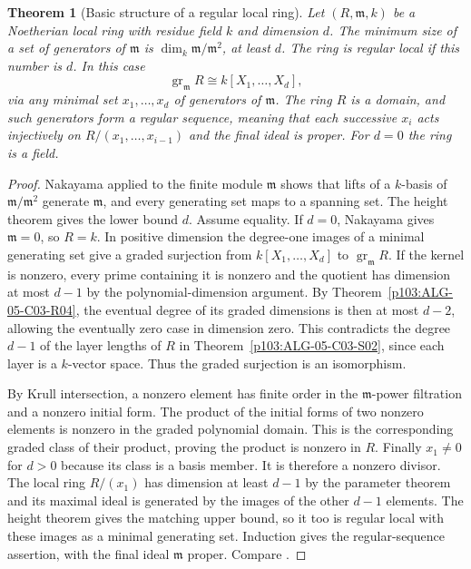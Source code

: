 \documentclass[11pt,oneside,openany]{book}
\newtheorem{theorem}{Theorem}[chapter]
\theoremstyle{definition}
\theoremstyle{remark}
\begin{document}
\begin{theorem}[Basic structure of a regular local ring]\label{p103:ALG-05-C03-S03}
Let \((R,\mathfrak m,k)\) be a Noetherian local ring with residue field \(k\) and dimension \(d\). The minimum size of a set of generators of \(\mathfrak m\) is \(\dim_k\mathfrak m/\mathfrak m^2\), at least \(d\). The ring is regular local if this number is \(d\). In this case
\[
 \operatorname{gr}_{\mathfrak m}R\cong k[X_1,\ldots,X_d],
\]
via any minimal set \(x_1,\ldots,x_d\) of generators of \(\mathfrak m\). The ring \(R\) is a domain, and such generators form a regular sequence, meaning that each successive \(x_i\) acts injectively on \(R/(x_1,\ldots,x_{i-1})\) and the final ideal is proper. For \(d=0\) the ring is a field.
\end{theorem}
\begin{proof}
Nakayama applied to the finite module \(\mathfrak m\) shows that lifts of a \(k\)-basis of \(\mathfrak m/\mathfrak m^2\) generate \(\mathfrak m\), and every generating set maps to a spanning set. The height theorem gives the lower bound \(d\). Assume equality. If \(d=0\), Nakayama gives \(\mathfrak m=0\), so \(R=k\). In positive dimension the degree-one images of a minimal generating set give a graded surjection from \(k[X_1,\ldots,X_d]\) to \(\operatorname{gr}_{\mathfrak m}R\). If the kernel is nonzero, every prime containing it is nonzero and the quotient has dimension at most \(d-1\) by the polynomial-dimension argument. By Theorem~\ref{p103:ALG-05-C03-R04}, the eventual degree of its graded dimensions is then at most \(d-2\), allowing the eventually zero case in dimension zero. This contradicts the degree \(d-1\) of the layer lengths of \(R\) in Theorem~\ref{p103:ALG-05-C03-S02}, since each layer is a \(k\)-vector space. Thus the graded surjection is an isomorphism.

By Krull intersection, a nonzero element has finite order in the \(\mathfrak m\)-power filtration and a nonzero initial form. The product of the initial forms of two nonzero elements is nonzero in the graded polynomial domain. This is the corresponding graded class of their product, proving the product is nonzero in \(R\). Finally \(x_1\ne0\) for \(d>0\) because its class is a basis member. It is therefore a nonzero divisor. The local ring \(R/(x_1)\) has dimension at least \(d-1\) by the parameter theorem and its maximal ideal is generated by the images of the other \(d-1\) elements. The height theorem gives the matching upper bound, so it too is regular local with these images as a minimal generating set. Induction gives the regular-sequence assertion, with the final ideal \(\mathfrak m\) proper. Compare \cite[Section 10.3]{eisenbud}.
\end{proof}
\end{document}
